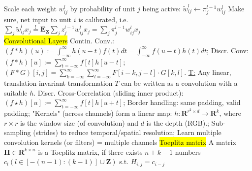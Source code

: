 \documentclass[11pt,landscape]{article}
\DeclareRobustCommand{\hlgray}[1]{{\sethlcolor{OliveGreen}\hl{#1}}}
\begin{document}
\begin{multicols*}{3}
Scale each weight $w^l_{ij}$ by probability of unit $j$ being active:
$\tilde{w}^l_{ij} \leftarrow \pi^{l-1}_j w^l_{ij}$ Make sure, net input to unit $i$ is calibrated, i.e.
$\sum_j \tilde{w}^l_{ij}x_j \overset{\text{!}}{=}\mathbf{E_Z}\sum_j z^{l-1}_j w^l_{ij} x_j = \sum_j\pi^{l-1}_j w^l_{ij}x_j$\\
\hl{Convolutional Layers}
Contin. Conv.: $(f\ast h)(u):=\int_{-\infty}^\infty h(u-t)f(t)dt=\int_{-\infty}^\infty f(u-t)h(t)dt$; Discr. Conv: 
$(f\ast h)[u]:=\sum_{t=-\infty}^\infty f[t]h[u-t]$;
$(F\ast G)[i,j]=\sum_{k=-\infty}^\infty\sum_{l=-\infty}^\infty 
F[i-k,j-l]\cdot G[k,l]$. \underline{T:} Any linear, translation-invariant transformation $T$ can be written as a convolution with a suitable $h$. Discr. Cross-Correlation (sliding inner product):
$(f\star h)[u]:=\sum_{t=-\infty}^\infty f[t]h[u+t]$; Border handling: same padding, valid padding; "Kernels" (across channels) form a linear map: $h:\mathbf{R}^{r^2\times d}\rightarrow\mathbf{R}^k$, where $r \times r$ is the window size (of convolution) and $d$ is the depth (RGB).; Sub-sampling (strides) to reduce temporal/spatial resolution; Learn multiple convolution kernels (or filters) = multiple channels 
\hlgray{Toeplitz matrix} 
A matrix $\mathbf{H}\in\mathbf{R}^{k\times n}$ is a Toeplitz matrix, if there exists $n+k-1$ numbers $c_l(l\in[-(n-1):(k-1)]\cup \mathbf{Z})$ s.t. $H_{i,j}=c_{i-j}$

\end{multicols*}
\end{document}
